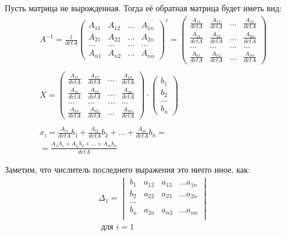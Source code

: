 Пусть матрица не вырожденная. Тогда её обратная матрица будет иметь вид: 
\begin{gather*}
  A^{-1} = \frac{1}{det A} \left( 
    \begin{matrix}
    A_{11} & A_{12} & \ldots & A_{1n} \\
    A_{21} & A_{22} & \ldots & A_{2n} \\
    \ldots & \ldots & \ldots & \ldots \\
    A_{n1} & A_{n2} & \ldots & A_{nn}
    \end{matrix}
  \right)^{\tau} = \left( 
  \begin{matrix}
    \frac{A_{11}}{det A} & \frac{A_{12}}{det A} & \ldots & \frac{A_{1n}}{det A} \\
    \frac{A_{21}}{det A} & \frac{A_{22}}{det A} & \ldots & \frac{A_{2n}}{det A} \\
    \ldots & \ldots & \ldots & \ldots \\
    \frac{A_{n1}}{det A} & \frac{A_{n2}}{det A} & \ldots & \frac{A_{nn}}{det A}
  \end{matrix}
  \right) \\
  \\
  X = \left( 
  \begin{matrix}
    \frac{A_{11}}{det A} & \frac{A_{12}}{det A} & \ldots & \frac{A_{1n}}{det A} \\
    \frac{A_{21}}{det A} & \frac{A_{22}}{det A} & \ldots & \frac{A_{2n}}{det A} \\
    \ldots & \ldots & \ldots & \ldots \\
    \frac{A_{n1}}{det A} & \frac{A_{n2}}{det A} & \ldots & \frac{A_{nn}}{det A}
  \end{matrix}\right) \cdot \left( 
  \begin{matrix}
    b_1 \\
    b_2 \\
    \ldots \\
    b_{n}
  \end{matrix}
\right) \\
  \\
  x_i = 
  \frac{A_{i1}}{det A} b_1 +
  \frac{A_{i2}}{det A} b_2 +
  \ldots +
  \frac{A_{in}}{det A} b_n = \\
  = \frac{A_{i1}b_1 + A_{i_2}b_2 + \ldots + A_{in}b_n}{det A}
\end{gather*}

Заметим, что числитель последнего выражения это ничто иное, как:
\begin{gather*}
  \Delta_1 = 
  \begin{vmatrix} 
    b_1 & a_{12} & a_{13} & \ldots a_{1n} \\
    b_2 & a_{22} & a_{23} & \ldots a_{2n} \\
    \ldots \\
    b_n & a_{2n} & a_{n3} & \ldots a_{nn} \\
  \end{vmatrix} \\
  \text{ для } i = 1
\end{gather*}


